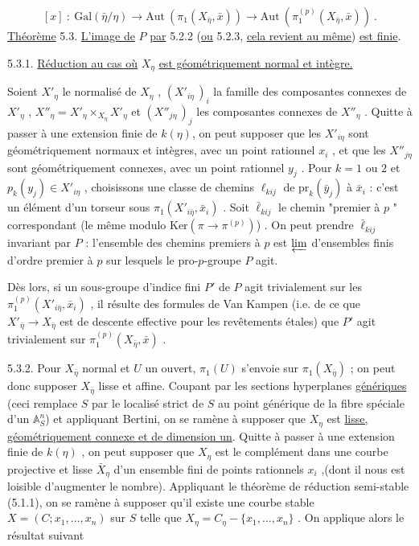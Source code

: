 
\begin{equation}\tag{5.2.3}
[x] \ : \ \mathrm{Gal}(\bar{\eta}/\eta) \longrightarrow \mathrm{Aut}\ (\pi_1(X_{\bar{\eta}},\bar{x})) \longrightarrow \mathrm{Aut}\ (\pi_1^{(p)}(X_{\bar{\eta}},\bar{x}))\ .
\end{equation}
\underline{Théorème} 5.3. \underline{L'image de} $P$ \underline{par} 5.2.2 (\underline{ou} 5.2.3, \underline{cela revient au même}) \underline{est finie}.


5.3.1. \underline{Réduction au cas où} $X_\eta$ \underline{est géométriquement normal et intègre.}

Soient $X'_\eta$ le normalisé de $X_\eta$ , $(X'_{i\eta}\,)_i$ la famille des composantes connexes de $X'_\eta$ , $X''_\eta = X'_\eta \times_{X_\eta} X'_\eta$ et $(X''_{j\eta}\,)_j$ les composantes connexes de $X''_\eta$ . Quitte à passer à une extension finie de $k(\eta)$, on peut supposer que les $X'_{i\eta}$ sont géométriquement normaux et intègres, avec un point rationnel $x_i$ , et que les $X''_{j\eta}$ sont géométriquement connexes, avec un point rationnel $y_j$ . Pour $k = 1$ ou $2$ et $p_k(y_j) \in X'_{i\eta}$ , choisissons une classe de chemins $\ell_{kij}$ de $\mathrm{pr}_k(\bar{y}_j)$ à $\bar{x}_i$ : c'est un élément d'un torseur sous $\pi_1(X'_{i\bar{\eta}},\bar{x}_i)$ . Soit $\bar{\ell}_{kij}$ le chemin "premier à $p$ " correspondant (le même modulo $\mathrm{Ker}(\pi \longrightarrow \pi^{(p)})$) . On peut prendre $\bar{\ell}_{kij}$ invariant par $P$ : l'ensemble des chemins premiers à $p$ est $\varprojlim$ d'ensembles finis d'ordre premier à $p$ sur lesquels le pro-$p$-groupe $P$ agit.

Dès lors, si un sous-groupe d'indice fini $P'$ de $P$ agit trivialement sur les $\pi_1^{(p)}(X'_{i\bar{\eta}},\bar{x}_i)$ , il résulte des formules de Van Kampen (i.e. de ce que $X'_{\bar{\eta}} \longrightarrow X_{\bar{\eta}}$ est de descente effective pour les revêtements étales) que $P'$ agit trivialement sur $\pi_1^{(p)}(X_{\bar{\eta}},\bar{x})$ .

5.3.2. Pour $X_{\bar{\eta}}$ normal et $U$ un ouvert, $\pi_1(U)$ s'envoie sur $\pi_1(X_{\bar{\eta}})$ ; on peut donc supposer $X_{\bar{\eta}}$ lisse et affine. Coupant par les sections hyperplanes \underline{génériques} (ceci remplace $S$ par le localisé strict de $S$ au point générique de la fibre spéciale d'un $\mathbb{A}^n_S$) et appliquant Bertini, on se ramène à supposer que $X_\eta$ est \underline{lisse, géométriquement connexe et de dimension un}. Quitte à passer à une extension finie de $k(\eta)$ , on peut supposer que $X_\eta$ est le complément dans une courbe projective et lisse $\bar{X}_\eta$ d'un ensemble fini de points rationnels $x_i$ ,(dont il nous est loisible d'augmenter le nombre). Appliquant le théorème de réduction semi-stable (5.1.1), on se ramène à supposer qu'il existe une courbe stable $X = (C ; x_1 ,\ldots, x_n)$ sur $S$ telle que $X_\eta = C_\eta - \{x_1 ,\ldots, x_n\}$ . On applique alors le résultat suivant


